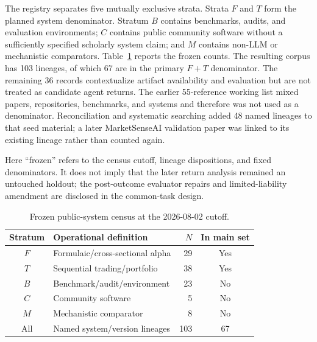 The registry separates five mutually exclusive strata.  Strata \(F\) and
\(T\) form the planned system denominator.  Stratum \(B\) contains benchmarks,
audits, and evaluation environments; \(C\) contains public community software
without a sufficiently specified scholarly system claim; and \(M\) contains
non-LLM or mechanistic comparators.  Table~\ref{tab:census-strata} reports the
frozen counts.  The resulting corpus has 103 lineages, of which 67 are in the
primary \(F+T\) denominator.  The remaining 36 records contextualize artifact
availability and evaluation but are not treated as candidate agent returns.
The earlier 55-reference working list mixed papers, repositories, benchmarks,
and systems and therefore was not used as a denominator.  Reconciliation and
systematic searching added 48 named lineages to that seed material; a later
MarketSenseAI validation paper was linked to its existing lineage rather than
counted again.

Here ``frozen'' refers to the census cutoff, lineage dispositions, and fixed
denominators.  It does not imply that the later return analysis remained an
untouched holdout; the post-outcome evaluator repairs and limited-liability
amendment are disclosed in the common-task design.

\begin{table}[t]
    \centering
    \small
    \caption{Frozen public-system census at the 2026-08-02 cutoff.}
    \label{tab:census-strata}
    \begin{tabular}{clrc}
        \toprule
        Stratum & Operational definition & \(N\) & In main set \\
        \midrule
        \(F\) & Formulaic/cross-sectional alpha & 29 & Yes \\
        \(T\) & Sequential trading/portfolio & 38 & Yes \\
        \(B\) & Benchmark/audit/environment & 23 & No \\
        \(C\) & Community software & 5 & No \\
        \(M\) & Mechanistic comparator & 8 & No \\
        \midrule
        All & Named system/version lineages & 103 & 67 \\
        \bottomrule
    \end{tabular}
\end{table}

